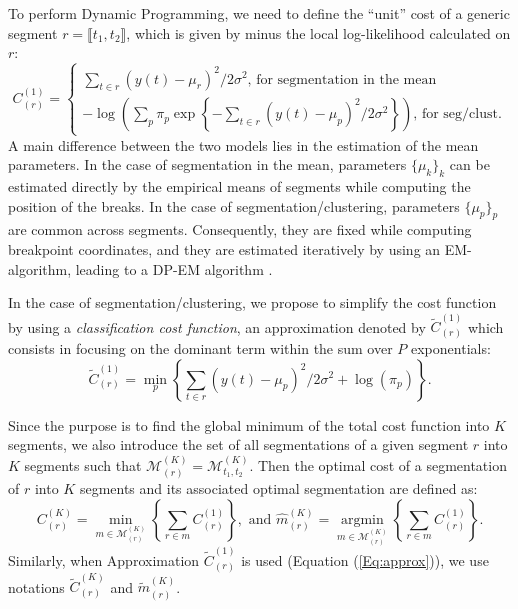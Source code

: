 \documentclass[11pt]{llncs}
\begin{document}
To perform Dynamic Programming, we need to define the ``unit'' cost of a generic segment $r = \llbracket t_1, t_2 \rrbracket$, which is given by minus the local log-likelihood calculated on $r$:
$$ C_{(r)}^{(1)} = 
\begin{cases}
\sum_{t \in r} (y(t) - \mu_r)^2/2 \sigma^2 \text{, for segmentation in the mean}  \\
-\log\left(\sum_p \pi_p \exp \left\{ - \sum_{t \in r} (y(t) - \mu_p)^2 / 2 \sigma^2 \right\}\right) \text{, for seg/clust}.
\end{cases}
$$ 
A main difference between the two models lies in the estimation of the mean parameters. In the case of segmentation in the mean, parameters $\{\mu_k\}_k$ can be estimated directly by the empirical means of segments while computing the position of the breaks. In the case of segmentation/clustering, parameters $\{\mu_p\}_p$ are common across segments. Consequently, they are fixed while computing breakpoint coordinates, and they are estimated iteratively by using an EM-algorithm, leading to a DP-EM algorithm \cite{picard_2007}. 

In the case of segmentation/clustering, we propose to simplify the cost function by using a \textit{classification cost function}, an approximation denoted by $\widetilde{C}_{(r)}^{(1)}$ which consists in focusing on the dominant term within the sum over $P$ exponentials:
\begin{equation}
\label{Eq:approx}
\widetilde{C}_{(r)}^{(1)}= \min_p \left\{ \sum_{t \in r}{(y(t) - \mu_p)^2} /{2\sigma^2 } + \log(\pi_p)\right\}.
\end{equation}

Since the purpose is to find the global minimum of the total cost function into $K$ segments, we also introduce the set of all segmentations of a given segment $r$ into $K$ segments such that $\mathcal{M}^{(K)}_{(r)} = \mathcal{M}^{(K)}_{t_1, t_2}$. Then the optimal cost of a segmentation of $r$ into $K$ segments and its associated optimal segmentation are defined as:
$$
C_{(r)}^{(K)} = \min_{m \in \mathcal{M}^{(K)}_{(r)}} \left\{ \sum_{r \in m} C^{(1)}_{(r)} \right\}, 
\text{ and }
\widehat{m}_{(r)}^{(K)} = \underset{m \in \mathcal{M}^{(K)}_{(r)}}{\operatorname{argmin}} \left\{ \sum_{r \in m} C^{(1)}_{(r)} \right\}.
$$
Similarly, when Approximation $\widetilde{C}_{(r)}^{(1)}$ is used (Equation (\ref{Eq:approx})), we use notations $\widetilde{C}_{(r)}^{(K)}$ and $\widetilde{m}_{(r)}^{(K)}$.
\end{document}
